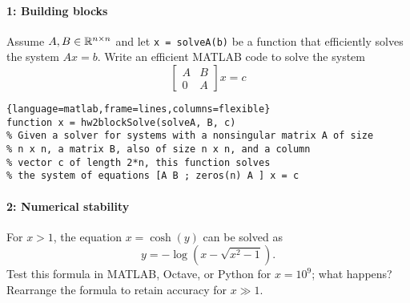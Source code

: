 \documentclass[12pt, leqno]{article}
\begin{document}

\paragraph{1: Building blocks}
Assume $A, B \in \mathbb{R}^{n \times n}$ and let {\tt x = solveA(b)} be a function
that efficiently solves the system $Ax = b$.
Write an efficient MATLAB code to solve the system
\[
  \begin{bmatrix} A & B \\ 0 & A \end{bmatrix} x = c
\]

\begin{lstlisting}{language=matlab,frame=lines,columns=flexible}
function x = hw2blockSolve(solveA, B, c)
% Given a solver for systems with a nonsingular matrix A of size
% n x n, a matrix B, also of size n x n, and a column
% vector c of length 2*n, this function solves 
% the system of equations [A B ; zeros(n) A ] x = c
\end{lstlisting}

\paragraph*{2: Numerical stability}
For $x > 1$, the equation $x = \cosh(y)$ can be solved as
\[
  y = -\log\left( x-\sqrt{x^2-1} \right).
\]
Test this formula in MATLAB, Octave, or Python for $x = 10^9$; what
happens?  Rearrange the formula to retain accuracy for $x \gg 1$.
\end{document}
